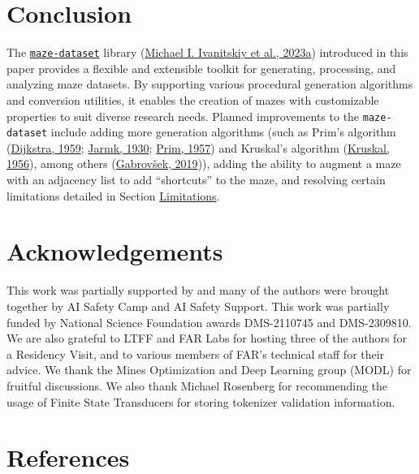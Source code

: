 \documentclass[10pt,a4paper,onecolumn]{article}
\begin{document}
\hypertarget{conclusion}{%
\section{Conclusion}\label{conclusion}}

The
\href{https://github.com/understanding-search/maze-dataset}{\texttt{maze-dataset}}
library (\protect\hyperlink{ref-maze-dataset-github}{Michael I.
Ivanitskiy et al., 2023a}) introduced in this paper provides a flexible
and extensible toolkit for generating, processing, and analyzing maze
datasets. By supporting various procedural generation algorithms and
conversion utilities, it enables the creation of mazes with customizable
properties to suit diverse research needs. Planned improvements to the
\texttt{maze-dataset} include adding more generation algorithms (such as
Prim's algorithm (\protect\hyperlink{ref-dijkstra-prim}{Dijkstra, 1959};
\protect\hyperlink{ref-jarnik-prim}{Jarnık, 1930};
\protect\hyperlink{ref-prim}{Prim, 1957}) and Kruskal's algorithm
(\protect\hyperlink{ref-kruskal}{Kruskal, 1956}), among others
(\protect\hyperlink{ref-mazegen_analysis}{Gabrovšek, 2019})), adding the
ability to augment a maze with an adjacency list to add ``shortcuts'' to
the maze, and resolving certain limitations detailed in Section
\protect\hyperlink{limitations}{Limitations}.

\hypertarget{acknowledgements}{%
\section{Acknowledgements}\label{acknowledgements}}

This work was partially supported by and many of the authors were
brought together by AI Safety Camp and AI Safety Support. This work was
partially funded by National Science Foundation awards DMS-2110745 and
DMS-2309810. We are also grateful to LTFF and FAR Labs for hosting three
of the authors for a Residency Visit, and to various members of FAR's
technical staff for their advice. We thank the Mines Optimization and
Deep Learning group (MODL) for fruitful discussions. We also thank
Michael Rosenberg for recommending the usage of Finite State Transducers
for storing tokenizer validation information.

\hypertarget{references}{%
\section*{References}\label{references}}
\end{document}
